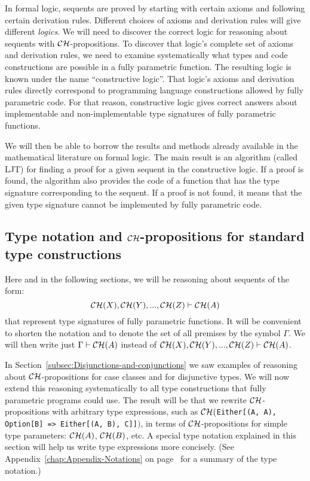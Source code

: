 In formal logic, sequents are proved by starting
with certain axioms and following certain derivation rules. Different
choices of axioms and derivation rules will give different \emph{logics}.
We will need to discover the correct logic for reasoning about sequents
with ${\cal CH}$-propositions. To discover that logic\textsf{'}s complete
set of axioms and derivation rules, we need to examine systematically
what types and code constructions are possible in a fully parametric
function. The resulting logic is known under the name \textsf{``}constructive
logic\textsf{''}. That logic\textsf{'}s axioms and derivation rules directly correspond
to programming language constructions allowed by fully parametric
code. For that reason, constructive logic gives correct answers about
implementable and non-implementable type signatures of fully parametric
functions.

We will then be able to borrow the results and methods already available
in the mathematical literature on formal logic. The main result is
an algorithm (called LJT) for finding a proof for a given sequent
in the constructive logic. If a proof is found, the algorithm also
provides the code of a function that has the type signature corresponding
to the sequent. If a proof is not found, it means that the given type
signature cannot be implemented by fully parametric code.

\subsection{Type notation and ${\cal CH}$-propositions for standard type constructions\label{subsec:Type-notation-and-standard-type-constructions}}

Here and in the following sections, we will be reasoning about sequents
of the form:
\[
{\cal CH}(X),{\cal CH}(Y),...,{\cal CH}(Z)\vdash{\cal CH}(A)
\]
that represent type signatures of fully parametric functions. It will
be convenient to shorten the notation and to denote the set of all
premises by the symbol $\Gamma$. We will then write just $\Gamma\vdash{\cal CH}(A)$
instead of ${\cal CH}(X),{\cal CH}(Y),...,{\cal CH}(Z)\vdash{\cal CH}(A)$. 

In Section~\ref{subsec:Disjunctions-and-conjunctions} we saw examples
of reasoning about ${\cal CH}$-propositions for case classes and
for disjunctive types. We will now extend this reasoning systematically
to all type constructions that fully parametric programs could use.
The result will be that we rewrite ${\cal CH}$-propositions with
arbitrary type expressions, such as ${\cal CH}($\lstinline!Either[(A, A), Option[B] => Either[(A, B), C]]!$)$,
in terms of ${\cal CH}$-propositions for simple type parameters:
${\cal CH}(A)$, ${\cal CH}(B)$, etc. A special type notation
explained in this section will help us write type expressions more
concisely. (See Appendix~\ref{chap:Appendix-Notations} on page~\pageref{chap:Appendix-Notations}
for a summary of the type notation.)

